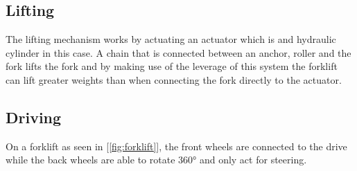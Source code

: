 \documentclass[11pt]{article}
\begin{document}
\subsection{Lifting}
The lifting mechanism works by actuating an actuator which is and hydraulic cylinder in this 
case. A chain that is connected between an anchor, roller and the fork lifts the fork and by 
making use of the leverage of this system the forklift can lift greater weights than when 
connecting the fork directly to the actuator.

\subsection{Driving}
On a forklift as seen in [\ref{fig:forklift}], the front wheels are connected to the drive
while the back wheels are able to rotate 360° and only act for steering.
\end{document}
